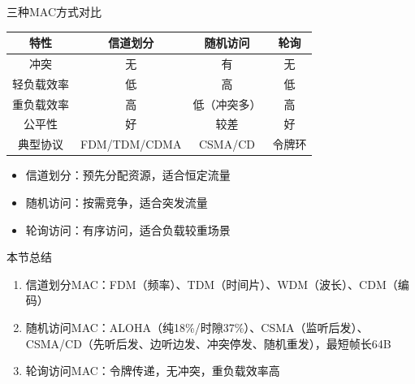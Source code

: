 \documentclass[10pt, aspectratio=169]{beamer}
\begin{document}
\begin{frame}{三种MAC方式对比}
    \begin{table}
        \centering
        \begin{tabular}{|c|c|c|c|}
            \hline
            \textbf{特性} & \textbf{信道划分} & \textbf{随机访问} & \textbf{轮询} \\
            \hline
            冲突 & 无 & 有 & 无 \\
            轻负载效率 & 低 & 高 & 低 \\
            重负载效率 & 高 & 低（冲突多） & 高 \\
            公平性 & 好 & 较差 & 好 \\
            典型协议 & FDM/TDM/CDMA & CSMA/CD & 令牌环 \\
            \hline
        \end{tabular}
    \end{table}
    \vspace{0.5em}
    \begin{itemize}
        \item 信道划分：预先分配资源，适合恒定流量
        \item 随机访问：按需竞争，适合突发流量
        \item 轮询访问：有序访问，适合负载较重场景
    \end{itemize}
\end{frame}

\begin{frame}{本节总结}
    \begin{enumerate}
        \item 信道划分MAC：FDM（频率）、TDM（时间片）、WDM（波长）、CDM（编码）
        \item 随机访问MAC：ALOHA（纯18\%/时隙37\%）、CSMA（监听后发）、CSMA/CD（先听后发、边听边发、冲突停发、随机重发），最短帧长64B
        \item 轮询访问MAC：令牌传递，无冲突，重负载效率高
    \end{enumerate}
\end{frame}
\end{document}
